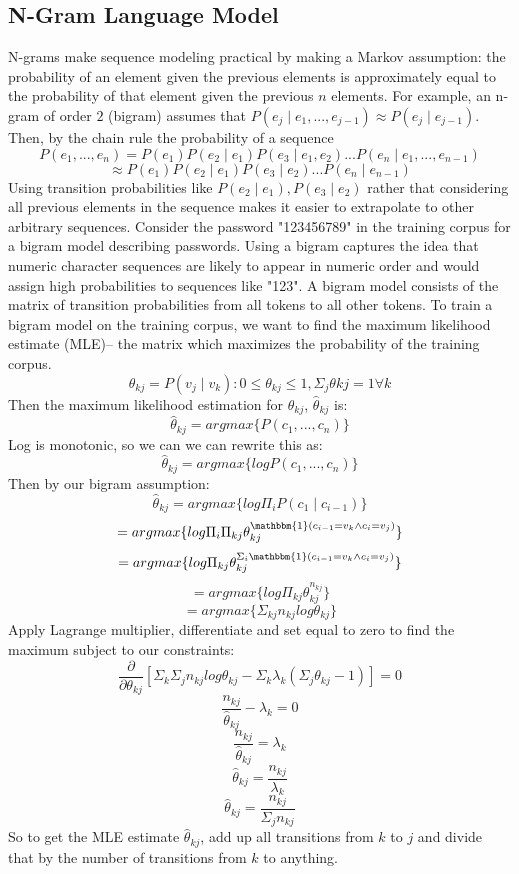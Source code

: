 \documentclass{amsart}
\theoremstyle{definition}
\theoremstyle{remark}
\numberwithin{equation}{section}
\begin{document}
\subsection{N-Gram Language Model}
N-grams make sequence modeling practical by making a Markov assumption: the probability of an element given the previous elements is approximately equal to the probability of that element given the previous $n$ elements. For example, an n-gram of order $2$ (bigram) assumes that $P(e_j \mid e_1, ..., e_{j - 1}) \approx P(e_j \mid e_{j - 1})$. Then, by the chain rule the probability of a sequence
$$P(e_1, ..., e_n) = P(e_1)P(e_2 \mid e_1)P(e_3 \mid e_1, e_2)...P(e_n \mid e_1, ..., e_{n - 1})$$
$$\approx P(e_1)P(e_2 \mid e_1)P(e_3 \mid e_2)...P(e_n \mid e_{n - 1})$$
Using transition probabilities like $P(e_2 \mid e_1), P(e_3 \mid e_2)$ rather that considering all previous elements in the sequence makes it easier to extrapolate to other arbitrary sequences. Consider the password "123456789" in the training corpus for a bigram model describing passwords. Using a bigram captures the idea that numeric character sequences are likely to appear in numeric order and would assign high probabilities to sequences like "123". A bigram model consists of the matrix of transition probabilities from all tokens to all other tokens. To train a bigram model on the training corpus, we want to find the maximum likelihood estimate (MLE)-- the matrix which maximizes the probability of the training corpus.
$$\theta_{kj} = P(v_j \mid v_k) : 0 \leq \theta_{kj} \leq 1, \Sigma_j \theta{kj} = 1 \forall k$$
Then the maximum likelihood estimation for $\theta_{kj}$, $\hat{\theta}_{kj}$ is:
$$\hat{\theta}_{kj} = argmax\{P(c_1, ..., c_n)\}$$
Log is monotonic, so we can we can rewrite this as:
$$\hat{\theta}_{kj} = argmax\{log P(c_1, ..., c_n)\}$$
Then by our bigram assumption:
$$\hat{\theta}_{kj}= argmax\{log \Pi_i P(c_1 \mid c_{i - 1})\}$$
$$= argmax\{log \Pi_i \Pi_{kj} \theta_{kj}^{\mathbbm{1}(c_{i - 1} = v_k \land c_i = v_j)}\}$$
$$= argmax\{log \Pi_{kj} \theta_{kj}^{\Sigma_i \mathbbm{1}(c_{i - 1} = v_k \land c_i = v_j)}\}$$
$$= argmax\{log \Pi_{kj} \theta_{kj}^{n_{kj}}\}$$
$$= argmax\{\Sigma_{kj} n_{kj} log \theta_{kj}\}$$
Apply Lagrange multiplier, differentiate and set equal to zero to find the maximum subject to our constraints:
$$\frac{\partial}{\partial \theta_{kj}}[\Sigma_k \Sigma_j n_{kj} log \theta_{kj} - \Sigma_k \lambda_k (\Sigma_j \theta_{kj} - 1)] = 0$$
$$\frac{n_{kj}}{\hat{\theta}_{kj}} - \lambda_k = 0$$
$$\frac{n_{kj}}{\hat{\theta}_{kj}} = \lambda_k$$
$$\hat{\theta}_{kj} = \frac{n_{kj}}{\lambda_k}$$
$$\hat{\theta}_{kj} = \frac{n_{kj}}{\Sigma_j n_{kj}}$$
So to get the MLE estimate $\hat{\theta}_{kj}$, add up all transitions from $k$ to $j$ and divide that by the number of transitions from $k$ to anything.
\end{document}
